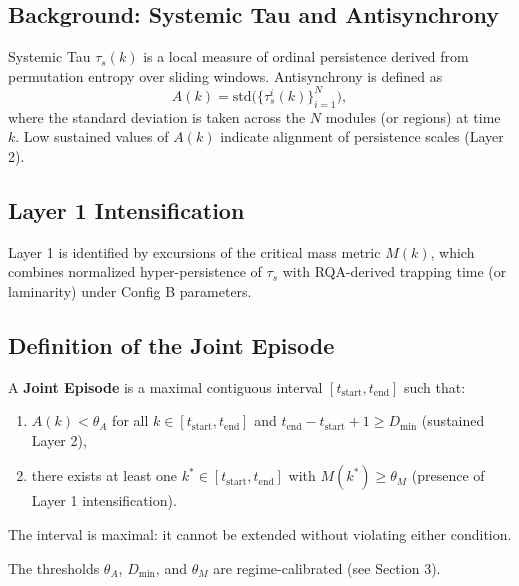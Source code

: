 \subsection{Background: Systemic Tau and Antisynchrony}

Systemic Tau $\tau_s(k)$ is a local measure of ordinal persistence derived from permutation entropy over sliding windows. Antisynchrony is defined as
\[
A(k) = \mathrm{std}\bigl(\{\tau_s^i(k)\}_{i=1}^N\bigr),
\]
where the standard deviation is taken across the $N$ modules (or regions) at time $k$. Low sustained values of $A(k)$ indicate alignment of persistence scales (Layer 2).

\subsection{Layer 1 Intensification}

Layer 1 is identified by excursions of the critical mass metric $M(k)$, which combines normalized hyper-persistence of $\tau_s$ with RQA-derived trapping time (or laminarity) under Config B parameters.

\subsection{Definition of the Joint Episode}

\begin{conceptbox}
A \textbf{Joint Episode} is a maximal contiguous interval $[t_\mathrm{start}, t_\mathrm{end}]$ such that:
\begin{enumerate}
    \item $A(k) < \theta_A$ for all $k \in [t_\mathrm{start}, t_\mathrm{end}]$ and $t_\mathrm{end} - t_\mathrm{start} + 1 \ge D_{\min}$ (sustained Layer 2),
    \item there exists at least one $k^* \in [t_\mathrm{start}, t_\mathrm{end}]$ with $M(k^*) \ge \theta_M$ (presence of Layer 1 intensification).
\end{enumerate}
The interval is maximal: it cannot be extended without violating either condition.
\end{conceptbox}

The thresholds $\theta_A$, $D_{\min}$, and $\theta_M$ are regime-calibrated (see Section 3).

